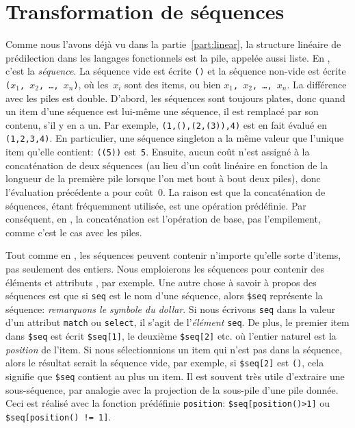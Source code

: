 \section{Transformation de séquences}

Comme nous l'avons déjà vu dans la partie~\ref{part:linear}, la
structure linéaire de prédilection dans les langages fonctionnels est
la pile, appelée aussi liste. En \XSLT, c'est la \emph{séquence}. La
séquence vide est écrite \texttt{()} et la séquence non-vide est
écrite \texttt{(\(x_1\), \(x_2\), \dots, \(x_n\))}, où les~\(x_i\)
sont des items, ou bien \texttt{\(x_1\), \(x_2\), \dots, \(x_n\)}. La
différence avec les piles est double. D'abord, les séquences sont
toujours plates, donc quand un item d'une séquence est lui-même une
séquence, il est remplacé par son contenu, s'il y en a un. Par
exemple, \texttt{(1,(),(2,(3)),4)} est en fait évalué en
\texttt{(1,2,3,4)}. En particulier, une séquence singleton a la même
valeur que l'unique item qu'elle contient: \texttt{((5))}
est~\texttt{5}. Ensuite, aucun coût n'est assigné à la concaténation
de deux séquences (au lieu d'un coût linéaire en fonction de la
longueur de la première pile lorsque l'on met bout à bout deux piles),
donc l'évaluation précédente a pour coût~\(0\). La raison est que la
concaténation de séquences, étant fréquemment utilisée, est une
opération prédéfinie. Par conséquent, en \XSLT, la concaténation est
l'opération de base, pas l'empilement, comme c'est le cas avec les
piles.

Tout comme en \Erlang, les séquences peuvent contenir n'importe
qu'elle sorte d'items, pas seulement des entiers. Nous emploierons les
séquences pour contenir des éléments et attributs \XML, par
exemple. Une autre chose à savoir à propos des séquences est que si
\texttt{seq} est le nom d'une séquence, alors \texttt{\$seq}
représente la séquence: \emph{remarquons le symbole du dollar}. Si
nous écrivons \texttt{seq} dans la valeur d'un attribut \texttt{match}
ou \texttt{select}, il s'agit de l'\emph{élément} \texttt{seq}. De
plus, le premier item dans \texttt{\$seq} est écrit \texttt{\$seq[1]},
le deuxième \texttt{\$seq[2]} etc. où l'entier naturel est la
\emph{position} de l'item. Si nous sélectionnions un item qui n'est
pas dans la séquence, alors le résultat serait la séquence vide, par
exemple, si \texttt{\$seq[2]} est \texttt{()}, cela signifie que
\texttt{\$seq} contient au plus un item. Il est souvent très utile
d'extraire une sous-séquence, par analogie avec la projection de la
sous-pile d'une pile donnée. Ceci est réalisé avec la fonction
prédéfinie \texttt{position}: \texttt{\$seq[position()>1]} ou
\texttt{\$seq[position() != 1]}.

